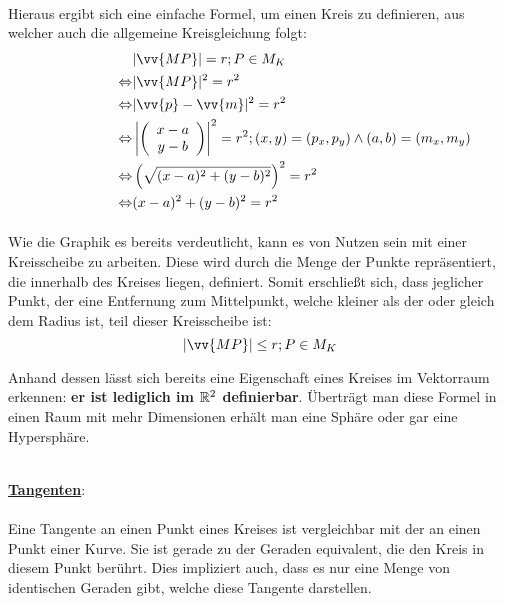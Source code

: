         \paragraph{} Hieraus ergibt sich eine einfache Formel, um einen Kreis zu definieren, aus welcher auch die allgemeine Kreisgleichung folgt:
        \begin{align*}
            \qquad \qquad \qquad &|\vv{MP}| = r ; P \in M_K \\
                 \Leftrightarrow &|\vv{MP}|^2 = r^2 \\
                 \Leftrightarrow &|\vv{p} - \vv{m}|^2 = r^2 \\
                 \Leftrightarrow &\left|\left(\begin{array}{c} x - a \\ y - b\end{array}\right)\right|^2 = r^2 ; (x,y) = (p_x,p_y) \land (a,b) = (m_x,m_y) \\
                 \Leftrightarrow &\left(\sqrt{(x - a)^2 + (y - b)^2}\right)^2 = r^2 \\
                 \Leftrightarrow &(x - a)^2 + (y - b)^2 = r^2 \\
        \end{align*}
        \paragraph{} Wie die Graphik es bereits verdeutlicht, kann es von Nutzen sein mit einer Kreisscheibe zu arbeiten. Diese wird durch die Menge der Punkte repräsentiert, die innerhalb des Kreises liegen, definiert.
        Somit erschließt sich, dass jeglicher Punkt, der eine Entfernung zum Mittelpunkt, welche kleiner als der oder gleich dem Radius ist, teil dieser Kreisscheibe ist:
                                                    $$|\vv{MP}| \leq r ; P \in M_K$$

        \begin{Bemerkung}
            Anhand dessen lässt sich bereits eine Eigenschaft eines Kreises im Vektorraum erkennen: \textbf{er ist lediglich im $\mathbb{R}^2$ definierbar}. Überträgt man diese Formel in einen Raum mit mehr Dimensionen erhält man eine Sphäre oder gar eine Hypersphäre.
        \end{Bemerkung}
        \\
        \textbf{\underline{Tangenten}}:
        \\
        \paragraph{} Eine Tangente an einen Punkt eines Kreises ist vergleichbar mit der an einen Punkt einer Kurve. Sie ist gerade zu der Geraden equivalent, die den Kreis in diesem Punkt berührt. Dies impliziert auch, dass es nur eine Menge von identischen Geraden gibt, welche diese Tangente darstellen.

